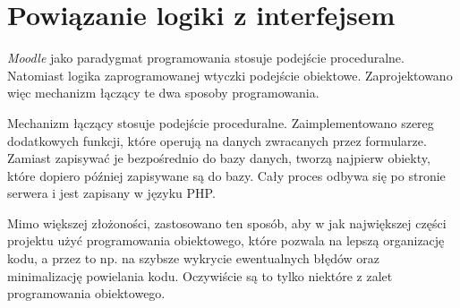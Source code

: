 \section{Powiązanie logiki z interfejsem}
\label{Chapter67}

\emph{Moodle} jako paradygmat programowania stosuje podejście proceduralne. Natomiast logika zaprogramowanej wtyczki podejście obiektowe. Zaprojektowano więc mechanizm łączący te dwa sposoby programowania.

Mechanizm łączący stosuje podejście proceduralne. Zaimplementowano szereg dodatkowych funkcji, które operują na danych zwracanych przez formularze. Zamiast zapisywać je bezpośrednio do bazy danych, tworzą najpierw obiekty, które dopiero później zapisywane są do bazy. Cały proces odbywa się po stronie serwera i jest zapisany w języku PHP. 

Mimo większej złożoności, zastosowano ten sposób, aby w jak największej części projektu użyć programowania obiektowego, które pozwala na lepszą organizację kodu, a przez to np. na szybsze wykrycie ewentualnych błędów oraz minimalizację powielania kodu. Oczywiście są to tylko niektóre z zalet programowania obiektowego.